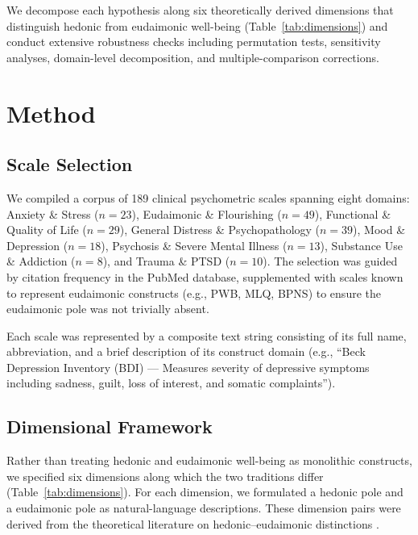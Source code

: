\documentclass[12pt,a4paper]{article}
\begin{document}
We decompose each hypothesis along six theoretically derived dimensions that distinguish hedonic from eudaimonic well-being (Table~\ref{tab:dimensions}) and conduct extensive robustness checks including permutation tests, sensitivity analyses, domain-level decomposition, and multiple-comparison corrections.

\section{Method}\label{sec:method}

\subsection{Scale Selection}\label{sec:scales}

We compiled a corpus of 189 clinical psychometric scales spanning eight domains: Anxiety \& Stress ($n = 23$), Eudaimonic \& Flourishing ($n = 49$), Functional \& Quality of Life ($n = 29$), General Distress \& Psychopathology ($n = 39$), Mood \& Depression ($n = 18$), Psychosis \& Severe Mental Illness ($n = 13$), Substance Use \& Addiction ($n = 8$), and Trauma \& PTSD ($n = 10$).
The selection was guided by citation frequency in the PubMed database, supplemented with scales known to represent eudaimonic constructs (e.g., PWB, MLQ, BPNS) to ensure the eudaimonic pole was not trivially absent.

Each scale was represented by a composite text string consisting of its full name, abbreviation, and a brief description of its construct domain (e.g., ``Beck Depression Inventory (BDI) --- Measures severity of depressive symptoms including sadness, guilt, loss of interest, and somatic complaints'').

\subsection{Dimensional Framework}\label{sec:dimensions}

Rather than treating hedonic and eudaimonic well-being as monolithic constructs, we specified six dimensions along which the two traditions differ (Table~\ref{tab:dimensions}).
For each dimension, we formulated a hedonic pole and a eudaimonic pole as natural-language descriptions.
These dimension pairs were derived from the theoretical literature on hedonic--eudaimonic distinctions
\citep{ryan2001happiness, waterman1993eudaimonia, huta2010pursuing, kashdan2008reconsidering}.
\end{document}
